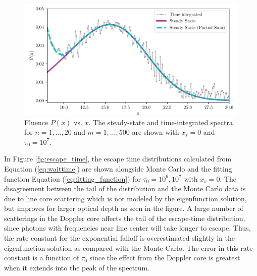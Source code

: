 \documentclass[linenumbers]{aastex63}
\begin{document}
\begin{figure}
    \centering
    \includegraphics{steadystate.pdf}
    \caption{Fluence $P(x)$ vs. $x$. The steady-state and time-integrated spectra for $n=1, ..., 20$ and $m=1, ..., 500$ are shown with $x_s=0$ and $\tau_0=10^7$.}
    \label{fig:steadystate}
\end{figure}


In Figure \ref{fig:escape_time}, the escape time distributions calculated from Equation (\ref{eq:waittime}) are shown alongside Monte Carlo and the fitting function Equation (\ref{eq:fitting_function}) for $\tau_0=10^6, 10^7$ with $x_s=0$. The disagreement between the tail of the distribution and the Monte Carlo data is due to line core scattering which is not modeled by the eigenfunction solution, but improves for larger optical depth as seen in the figure. A large number of scatterings in the Doppler core affects the tail of the escape-time distribution, since photons with frequencies near line center will take longer to escape. Thus, the rate constant for the exponential falloff is overestimated slightly in the eigenfunction solution as compared with the Monte Carlo. The error in this rate constant is a function of $\tau_0$ since the effect from the Doppler core is greatest when it extends into the peak of the spectrum.
\end{document}
